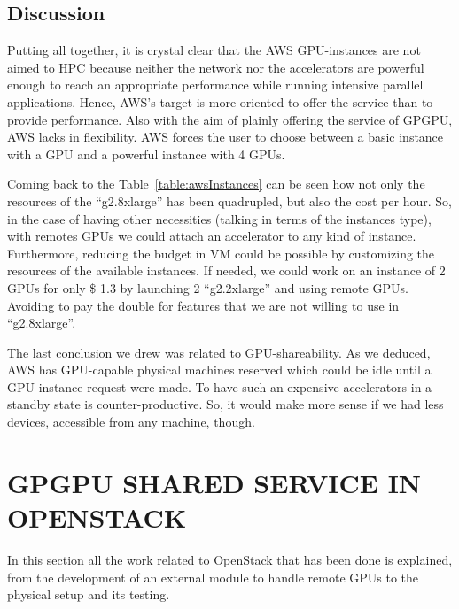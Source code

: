 \documentclass[a4paper,twoside]{article}
\begin{document}
\subsection{Discussion}
Putting all together,  it is crystal clear that the AWS GPU-instances are not aimed to HPC because neither the network nor the accelerators are powerful enough to reach an appropriate performance
while running intensive parallel applications. 
Hence, AWS's target is more oriented to offer the service than to provide performance.
Also with the aim of plainly offering the service of GPGPU, AWS lacks in flexibility. 
AWS forces the user to choose between a basic instance with a GPU and a powerful instance with 4 GPUs.

Coming back to the Table~\ref{table:awsInstances} can be seen how not only the resources of the ``g2.8xlarge'' has been quadrupled, but also the cost per hour.
So, in the case of having other necessities (talking in terms of the instances type), with remotes GPUs we could attach an accelerator to any kind of instance.
Furthermore, reducing the budget in VM could be possible by customizing the resources of the available instances.
If needed, we could work on an instance of 2 GPUs for only \$ 1.3 by launching 2 ``g2.2xlarge'' and using remote GPUs. 
Avoiding to pay the double for features that we are not willing to use in ``g2.8xlarge''.

The last conclusion we drew was related to GPU-shareability. 
As we deduced, AWS has GPU-capable physical machines reserved which could be idle until a GPU-instance request were made.
To have such an expensive accelerators in a standby state is counter-productive. So, it would make more sense if we had less devices, accessible from any machine, though.

\section{\uppercase{GPGPU Shared Service in OpenStack}}
In this section all the work related to OpenStack that has been done is explained, from the development of an external module to handle remote GPUs to the physical setup and its testing.
\end{document}
